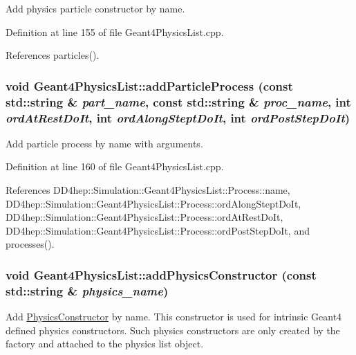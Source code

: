 Add physics particle constructor by name. 

Definition at line 155 of file Geant4PhysicsList.cpp.

References particles().\hypertarget{class_d_d4hep_1_1_simulation_1_1_geant4_physics_list_a8c689c3ac8a923ff713c4389b5b502b4}{
\subsubsection[{addParticleProcess}]{\setlength{\rightskip}{0pt plus 5cm}void Geant4PhysicsList::addParticleProcess (const std::string \& {\em part\_\-name}, \/  const std::string \& {\em proc\_\-name}, \/  int {\em ordAtRestDoIt}, \/  int {\em ordAlongSteptDoIt}, \/  int {\em ordPostStepDoIt})}}
\label{class_d_d4hep_1_1_simulation_1_1_geant4_physics_list_a8c689c3ac8a923ff713c4389b5b502b4}


Add particle process by name with arguments. 

Definition at line 160 of file Geant4PhysicsList.cpp.

References DD4hep::Simulation::Geant4PhysicsList::Process::name, DD4hep::Simulation::Geant4PhysicsList::Process::ordAlongSteptDoIt, DD4hep::Simulation::Geant4PhysicsList::Process::ordAtRestDoIt, DD4hep::Simulation::Geant4PhysicsList::Process::ordPostStepDoIt, and processes().\hypertarget{class_d_d4hep_1_1_simulation_1_1_geant4_physics_list_af9405b117100861f7e365e8362a35fa4}{
\subsubsection[{addPhysicsConstructor}]{\setlength{\rightskip}{0pt plus 5cm}void Geant4PhysicsList::addPhysicsConstructor (const std::string \& {\em physics\_\-name})}}
\label{class_d_d4hep_1_1_simulation_1_1_geant4_physics_list_af9405b117100861f7e365e8362a35fa4}


Add \hyperlink{class_d_d4hep_1_1_simulation_1_1_geant4_physics_list_1_1_physics_constructor}{PhysicsConstructor} by name. This constructor is used for intrinsic Geant4 defined physics constructors. Such physics constructors are only created by the factory and attached to the physics list object. 


